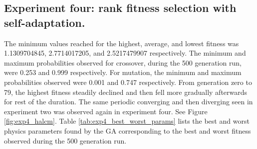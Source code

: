 

\newpage

\subsection[Experiment Four]{Experiment four: rank fitness selection with self-adaptation.}

The minimum values reached for the highest, average, and lowest fitness was 1.1309704845, 2.7714017205, and 2.5217479907 respectively. The minimum and maximum probabilities observed for crossover, during the 500 generation run, were 0.253 and 0.999 respectively. For mutation, the minimum and maximum probabilities observed were 0.001 and 0.747 respectively. From generation zero to 79, the highest fitness steadily declined and then fell more gradually afterwards for rest of the duration. The same periodic converging and then diverging seen in experiment two was observed again in experiment four. See Figure \ref{fig:exp4_halcm}. Table \ref{tab:exp4_best_worst_params} lists the best and worst physics parameters found by the GA corresponding to the best and worst fitness observed during the 500 generation run.

